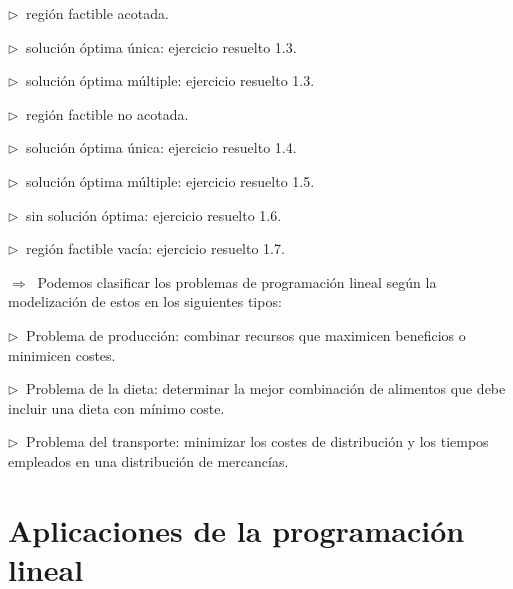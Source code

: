 \begin{adjustwidth}{50pt}{10pt}
$\triangleright \ $ región factible acotada.

\hspace{1cm} $\triangleright \ $  solución óptima única: \textcolor{gris}{ejercicio resuelto 1.3.}

\hspace{1cm} $\triangleright \ $  solución óptima múltiple: \textcolor{gris}{ejercicio resuelto 1.3.}

$\triangleright \ $  región factible no acotada.

\hspace{1cm} $\triangleright \ $  solución óptima única: \textcolor{gris}{ejercicio resuelto 1.4.}

\hspace{1cm} $\triangleright \ $  solución óptima múltiple: \textcolor{gris}{ejercicio resuelto 1.5.}

\hspace{1cm} $\triangleright \ $  sin solución óptima: \textcolor{gris}{ejercicio resuelto 1.6.}

$\triangleright \ $  región factible vacía: \textcolor{gris}{ejercicio resuelto 1.7.}
\end{adjustwidth}
		
\vspace{5mm} $\Longrightarrow \ $ Podemos clasificar los problemas de programación lineal según la modelización de estos en los siguientes tipos:

\begin{adjustwidth}{50pt}{10pt}

$\triangleright \ $ Problema de producción: combinar recursos que maximicen beneficios o minimicen costes.

$\triangleright \ $ Problema de la dieta: determinar la mejor combinación de alimentos que debe incluir una dieta con mínimo coste.

$\triangleright \ $ Problema del transporte: minimizar los costes de distribución y los tiempos empleados en una distribución de mercancías.
\end{adjustwidth}



\section{Aplicaciones de la programación lineal}
	\vspace{10mm}


